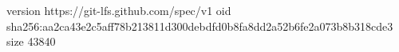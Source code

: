 version https://git-lfs.github.com/spec/v1
oid sha256:aa2ca43e2c5aff78b213811d300debdfd0b8fa8dd2a52b6fe2a073b8b318cde3
size 43840
